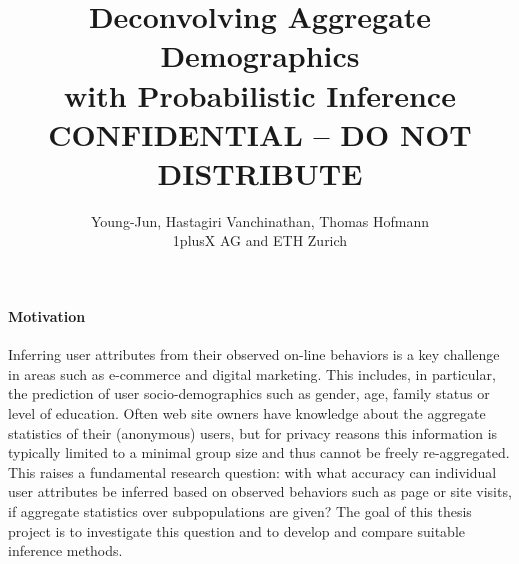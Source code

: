 \documentclass{article} %
\title{Deconvolving Aggregate Demographics \\ with Probabilistic Inference \\[4mm] CONFIDENTIAL -- DO NOT DISTRIBUTE }
\author{Young-Jun, Hastagiri Vanchinathan, Thomas Hofmann \\
1plusX AG and ETH Zurich}
\begin{document}
\maketitle


\paragraph*{Motivation} Inferring user attributes from their observed on-line behaviors is a key challenge in areas such as e-commerce and digital marketing. This includes, in particular, the prediction of user socio-demographics  such as gender, age, family status or level of education. Often web site owners have knowledge about the aggregate statistics of their (anonymous) users, but for privacy reasons this information is typically limited to a minimal group size and thus cannot be freely re-aggregated. This raises a fundamental research question: with what accuracy can individual user attributes be inferred based on observed behaviors such as page or site visits, if aggregate statistics over subpopulations are given? The goal of this thesis project is to investigate this question and to develop and compare suitable inference methods. 
\end{document}
